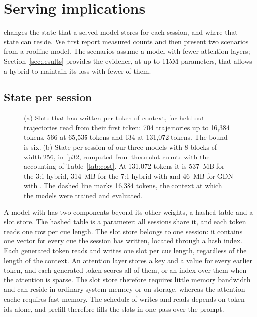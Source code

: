 \section{Serving implications}
\label{sec:serving}

\ingram{} changes the state that a served model stores for each session, and where that state can
reside. We first report measured counts and then present two scenarios from a roofline model. The
scenarios assume a model with fewer attention layers; Section~\ref{sec:results} provides the
evidence, at up to 115M parameters, that \ingram{} allows a hybrid to maintain its loss with fewer
of them.

\subsection{State per session}
\label{sec:serving-kind}

\begin{figure}[tb]
\centering

\caption{(a) Slots that \ingram{} has written per token of context, for held-out trajectories read
from their first token: 704 trajectories up to 16,384 tokens, 566 at 65,536 tokens and 134 at
131,072 tokens. The bound is six. (b) State per session of our three models with 8 blocks of width
256, in fp32, computed from these slot counts with the accounting of Table~\ref{tab:cost}. At
131,072 tokens it is 537~MB for the 3:1 hybrid, 314~MB for the 7:1 hybrid with \ingram{} and
46~MB for GDN with \ingram{}. The dashed line marks 16,384 tokens, the context at which the models were
trained and evaluated.}
\label{fig:state}
\end{figure}

A model with \ingram{} has two components beyond its other weights, a hashed table and a slot
store. The hashed table is a parameter: all sessions share it, and each token reads one row per cue length. The slot store
belongs to one session: it contains one vector for every cue the session has written, located
through a hash index. Each generated token reads and writes one slot per cue length, regardless of
the length of the context. An attention layer stores a key and a value for every earlier token,
and each generated token scores all of them, or an index over them when the attention is sparse.
The slot store therefore requires little memory bandwidth and can reside in ordinary system memory
or on storage, whereas the attention cache requires fast memory. The schedule of writes and reads
depends on token ids alone, and prefill therefore fills the slots in one pass over the prompt.


